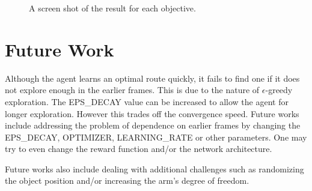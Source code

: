 \documentclass[a4paper]{article}
\begin{document}
\begin{figure}[htp]
  \centering
  \vfill
  \caption{A screen shot of the result for each objective.}
  \label{fig:result}
\end{figure}

\clearpage
\section{Future Work}
Although the agent learns an optimal route quickly, it fails to find one if it does not explore enough in the earlier frames. This is due to the nature of \(\epsilon\)-greedy exploration. The EPS\_DECAY value can be increased to allow the agent for longer exploration. However this trades off the convergence speed. Future works include addressing the  problem of dependence on earlier frames by changing the EPS\_DECAY, OPTIMIZER, LEARNING\_RATE or other parameters. One may try to even change the reward function and/or the network architecture.

Future works also include dealing with additional challenges such as randomizing the object position and/or increasing the arm's degree of freedom.



\end{document}
